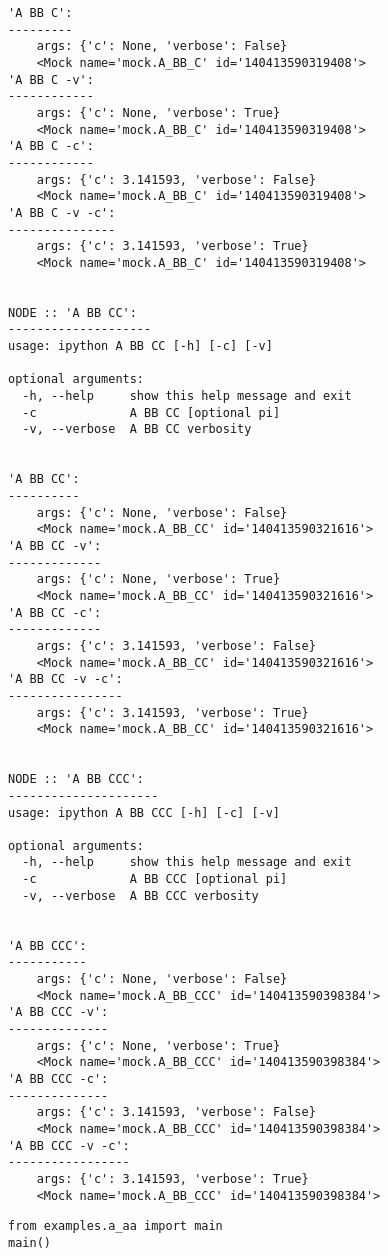 \documentclass[10pt]{amsart}
\numberwithin{equation}{section}
\begin{document}
\begin{verbatim}
'A BB C':
---------
	args: {'c': None, 'verbose': False}
	<Mock name='mock.A_BB_C' id='140413590319408'>
'A BB C -v':
------------
	args: {'c': None, 'verbose': True}
	<Mock name='mock.A_BB_C' id='140413590319408'>
'A BB C -c':
------------
	args: {'c': 3.141593, 'verbose': False}
	<Mock name='mock.A_BB_C' id='140413590319408'>
'A BB C -v -c':
---------------
	args: {'c': 3.141593, 'verbose': True}
	<Mock name='mock.A_BB_C' id='140413590319408'>


NODE :: 'A BB CC':
--------------------
usage: ipython A BB CC [-h] [-c] [-v]

optional arguments:
  -h, --help     show this help message and exit
  -c             A BB CC [optional pi]
  -v, --verbose  A BB CC verbosity


'A BB CC':
----------
	args: {'c': None, 'verbose': False}
	<Mock name='mock.A_BB_CC' id='140413590321616'>
'A BB CC -v':
-------------
	args: {'c': None, 'verbose': True}
	<Mock name='mock.A_BB_CC' id='140413590321616'>
'A BB CC -c':
-------------
	args: {'c': 3.141593, 'verbose': False}
	<Mock name='mock.A_BB_CC' id='140413590321616'>
'A BB CC -v -c':
----------------
	args: {'c': 3.141593, 'verbose': True}
	<Mock name='mock.A_BB_CC' id='140413590321616'>


NODE :: 'A BB CCC':
---------------------
usage: ipython A BB CCC [-h] [-c] [-v]

optional arguments:
  -h, --help     show this help message and exit
  -c             A BB CCC [optional pi]
  -v, --verbose  A BB CCC verbosity


'A BB CCC':
-----------
	args: {'c': None, 'verbose': False}
	<Mock name='mock.A_BB_CCC' id='140413590398384'>
'A BB CCC -v':
--------------
	args: {'c': None, 'verbose': True}
	<Mock name='mock.A_BB_CCC' id='140413590398384'>
'A BB CCC -c':
--------------
	args: {'c': 3.141593, 'verbose': False}
	<Mock name='mock.A_BB_CCC' id='140413590398384'>
'A BB CCC -v -c':
-----------------
	args: {'c': 3.141593, 'verbose': True}
	<Mock name='mock.A_BB_CCC' id='140413590398384'>
\end{verbatim}

\begin{verbatim}
from examples.a_aa import main
main()
\end{verbatim}
\end{document}
